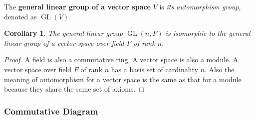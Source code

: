 \documentclass[12pt, letterpaper]{article}
\newcommand{\GL}{\operatorname{GL}}
\newtheorem{cor}[prop]{Corollary}
\theoremstyle{definition}
\theoremstyle{remark}
\theoremstyle{definition}
\theoremstyle{plain}
\numberwithin{equation}{section}
\begin{document}
	\begin{def*}
		The \textbf{general linear group of a vector space} $V$ is \textit{its automorphism group}, denoted as $\GL(V)$.
	\end{def*}
	\begin{cor}
		The general linear group $\GL(n, F)$ is isomorphic to the general linear group of a vector space over field $F$ of rank $n$.
	\end{cor}
	\begin{proof}
		A field is also a commutative ring.
		A vector space is also a module.
		A vector space over field $F$ of rank $n$ has a basis set of cardinality $n$.
		Also the meaning of automorphism for a vector space is the same as that for a module
		because they share the same set of axioms.
	\end{proof}

	\subsubsection{Commutative Diagram}
	\label{sec:comm_diag}
\end{document}
